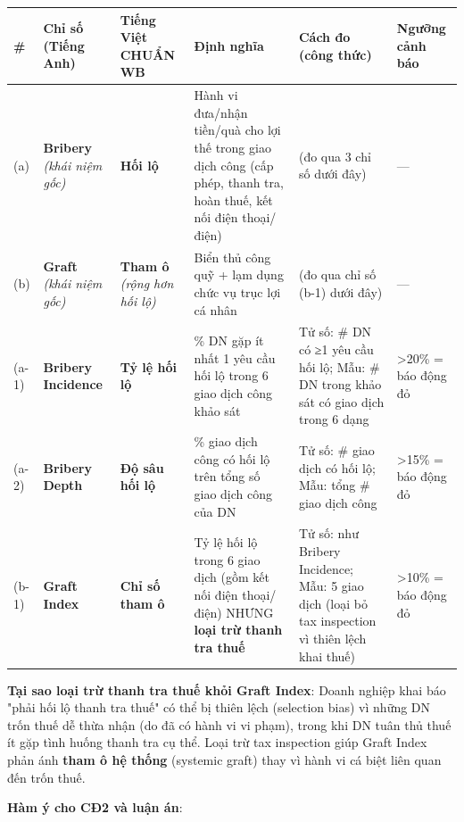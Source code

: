 \documentclass[12pt,a4paper]{article}
\begin{document}
\begin{longtable}[]{@{}llllll@{}}
\toprule\noalign{}
\# & Chỉ số (Tiếng Anh) & Tiếng Việt CHUẨN WB & Định nghĩa & Cách đo
(công thức) & Ngưỡng cảnh báo \\
\midrule\noalign{}
\endhead
\bottomrule\noalign{}
\endlastfoot
(a) & \textbf{Bribery} \emph{(khái niệm gốc)} & \textbf{Hối lộ} & Hành
vi đưa/nhận tiền/quà cho lợi thế trong giao dịch công (cấp phép, thanh
tra, hoàn thuế, kết nối điện thoại/điện) & (đo qua 3 chỉ số dưới đây) &
--- \\
(b) & \textbf{Graft} \emph{(khái niệm gốc)} & \textbf{Tham ô}
\emph{(rộng hơn hối lộ)} & Biển thủ công quỹ + lạm dụng chức vụ trục lợi
cá nhân & (đo qua chỉ số (b-1) dưới đây) & --- \\
(a-1) & \textbf{Bribery Incidence} & \textbf{Tỷ lệ hối lộ} & \% DN gặp
ít nhất 1 yêu cầu hối lộ trong 6 giao dịch công khảo sát & Tử số: \# DN
có ≥1 yêu cầu hối lộ; Mẫu: \# DN trong khảo sát có giao dịch trong 6
dạng & \textgreater20\% = báo động đỏ \\
(a-2) & \textbf{Bribery Depth} & \textbf{Độ sâu hối lộ} & \% giao dịch
công có hối lộ trên tổng số giao dịch công của DN & Tử số: \# giao dịch
có hối lộ; Mẫu: tổng \# giao dịch công & \textgreater15\% = báo động
đỏ \\
(b-1) & \textbf{Graft Index} & \textbf{Chỉ số tham ô} & Tỷ lệ hối lộ
trong 6 giao dịch (gồm kết nối điện thoại/điện) NHƯNG \textbf{loại trừ
thanh tra thuế} & Tử số: như Bribery Incidence; Mẫu: 5 giao dịch (loại
bỏ tax inspection vì thiên lệch khai thuế) & \textgreater10\% = báo động
đỏ \\
\end{longtable}

\textbf{Tại sao loại trừ thanh tra thuế khỏi Graft Index}: Doanh nghiệp
khai báo "phải hối lộ thanh tra thuế" có thể bị thiên lệch (selection
bias) vì những DN trốn thuế dễ thừa nhận (do đã có hành vi vi phạm),
trong khi DN tuân thủ thuế ít gặp tình huống thanh tra cụ thể. Loại trừ
tax inspection giúp Graft Index phản ánh \textbf{tham ô hệ thống}
(systemic graft) thay vì hành vi cá biệt liên quan đến trốn thuế.

\textbf{Hàm ý cho CĐ2 và luận án}:
\end{document}
